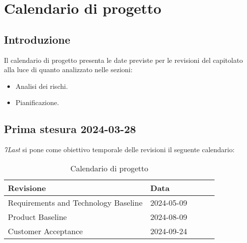 \section{Calendario di progetto}
\subsection{Introduzione}
Il calendario di progetto presenta le date previste per le revisioni del capitolato alla luce di quanto analizzato nelle sezioni:
\begin{itemize}
    \item Analisi dei rischi.
    \item Pianificazione.
\end{itemize}

\subsection{Prima stesura 2024-03-28}
\textit{7Last} si pone come obiettivo temporale delle revisioni il seguente calendario:
\begin{table}[!h]
    \begin{center}
        \begin{tabular}{ | l | l | l | l | l | }
            \hline
            Revisione                               & Data       \\ \hline
            Requirements and Technology Baseline    & 2024-05-09 \\
            Product Baseline                        & 2024-08-09 \\
            Customer Acceptance                     & 2024-09-24 \\
            \hline
        \end{tabular}
    \end{center}
    \caption{Calendario di progetto}
    \label{tab:10}
\end{table}
\newpage
%
